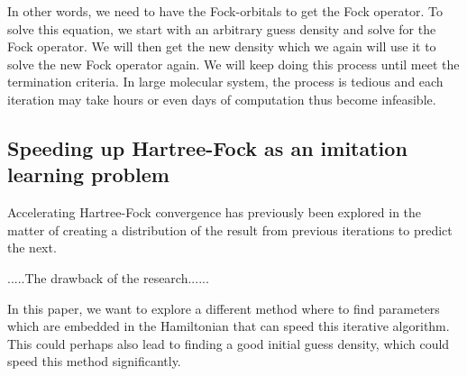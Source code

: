 \documentclass[twoside]{article}
\begin{document}



In other words, we need to have the Fock-orbitals to get the Fock operator. To solve this equation, we start with an arbitrary guess density and solve for the Fock operator. We will then get the new density which we again will use it to solve the new Fock operator again. We will keep doing this process until meet the termination criteria. In large molecular system, the process is tedious and each iteration may take hours or even days of computation thus become infeasible.


\subsection{Speeding up Hartree-Fock as an imitation learning problem}


Accelerating Hartree-Fock convergence has previously been explored in the matter of creating a distribution of the result from previous iterations to predict the next\cite{Pulay1980}. 

.....The drawback of the research......

In this paper,
we want to explore a different method where to find parameters which are embedded in the Hamiltonian that can speed this iterative algorithm. This could perhaps also lead to finding a good initial guess density, which could speed this method significantly. 






\end{document}
